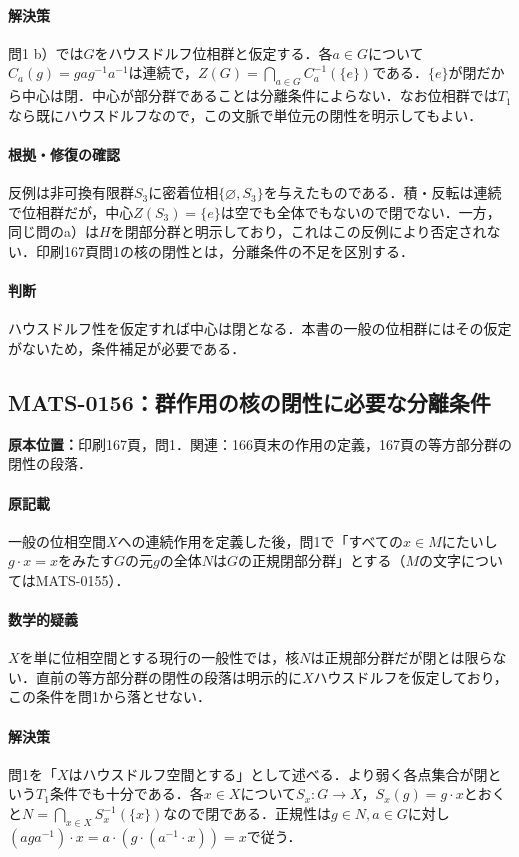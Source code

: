 \documentclass[a4paper,10pt]{ltjsarticle}
\begin{document}
\paragraph{解決策}問1 b）では$G$をハウスドルフ位相群と仮定する．各$a\in G$について$C_a(g)=gag^{-1}a^{-1}$は連続で，$Z(G)=\bigcap_{a\in G}C_a^{-1}(\{e\})$である．$\{e\}$が閉だから中心は閉．中心が部分群であることは分離条件によらない．なお位相群では$T_1$なら既にハウスドルフなので，この文脈で単位元の閉性を明示してもよい．

\paragraph{根拠・修復の確認}反例は非可換有限群$S_3$に密着位相$\{\varnothing,S_3\}$を与えたものである．積・反転は連続で位相群だが，中心$Z(S_3)=\{e\}$は空でも全体でもないので閉でない．一方，同じ問のa）は$H$を閉部分群と明示しており，これはこの反例により否定されない．印刷167頁問1の核の閉性とは，分離条件の不足を区別する．

\paragraph{判断}ハウスドルフ性を仮定すれば中心は閉となる．本書の一般の位相群にはその仮定がないため，条件補足が必要である．


\subsection*{MATS-0156：群作用の核の閉性に必要な分離条件}\label{math:MATS-0156}
\noindent\textbf{原本位置：}印刷167頁，問1．関連：166頁末の作用の定義，167頁の等方部分群の閉性の段落．

\paragraph{原記載}一般の位相空間$X$への連続作用を定義した後，問1で「すべての$x\in M$にたいし$g\cdot x=x$をみたす$G$の元$g$の全体$N$は$G$の正規閉部分群」とする（$M$の文字についてはMATS-0155）．

\paragraph{数学的疑義}$X$を単に位相空間とする現行の一般性では，核$N$は正規部分群だが閉とは限らない．直前の等方部分群の閉性の段落は明示的に$X$ハウスドルフを仮定しており，この条件を問1から落とせない．

\paragraph{解決策}問1を「$X$はハウスドルフ空間とする」として述べる．より弱く各点集合が閉という$T_1$条件でも十分である．各$x\in X$について$S_x:G\to X$，$S_x(g)=g\cdot x$とおくと$N=\bigcap_{x\in X}S_x^{-1}(\{x\})$なので閉である．正規性は$g\in N,a\in G$に対し$(aga^{-1})\cdot x=a\cdot(g\cdot(a^{-1}\cdot x))=x$で従う．
\end{document}
